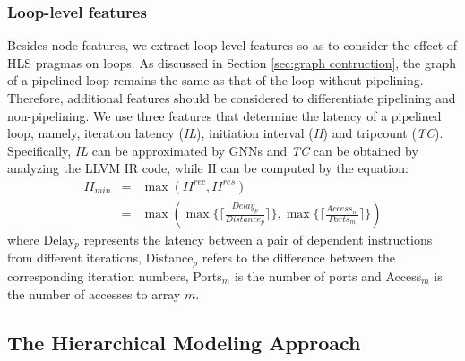 \documentclass[conference]{IEEEtran}
\begin{document}
\subsubsection{Loop-level features} Besides node features, we extract loop-level features so as to consider the effect of HLS pragmas on loops. As discussed in Section \ref{sec:graph contruction}, the graph of a pipelined loop remains the same as that of the loop without pipelining. Therefore, additional features should be considered to differentiate pipelining and non-pipelining. We use three features that determine the latency of a pipelined loop, namely, iteration latency (\textit{IL}), initiation interval (\textit{II}) and tripcount (\textit{TC}). Specifically, \textit{IL} can be approximated by GNNs and \textit{TC} can be obtained by analyzing the LLVM IR code, while II can be computed by the equation\cite{8695879}:
\vspace{-0.1cm}
\begin{eqnarray*}
II_\textit{min} & = & \max(II^{rec}, II^{res}) \\
   & = & \max(\max\{\lceil \frac{\textit{Delay}_p}{\textit{Distance}_p} \rceil\}, \max\{\lceil \frac{\textit{Access}_m}{\textit{Ports}_m} \rceil\})
\end{eqnarray*}
where Delay$_p$ represents the latency between a pair of dependent instructions from different iterations, Distance$_p$ refers to the difference between the corresponding iteration numbers, Ports$_m$ is the number of ports and Access$_m$ is the number of accesses to array $m$. %




\vspace{-0.1cm} 
\subsection{The Hierarchical Modeling Approach}
\label{ssec: model}
\vspace{-0.1cm} 
\end{document}

